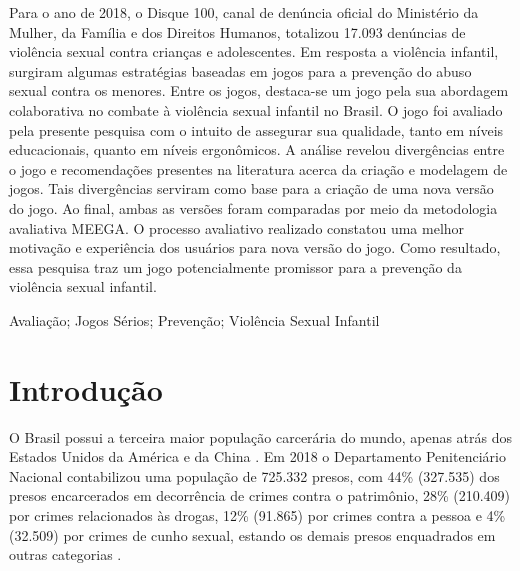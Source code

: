 \documentclass[alpha-refs,brazilian]{RBCA_v2.0}
\begin{document}
\begin{frontmatter}
\begin{resumo}
    Para o ano de 2018, o Disque 100, canal de denúncia oficial do Ministério da Mulher, da Família e dos Direitos Humanos, totalizou 17.093 denúncias de violência sexual contra crianças e adolescentes. Em resposta a violência infantil, surgiram algumas estratégias baseadas em jogos para a prevenção do abuso sexual contra os menores. Entre os jogos, destaca-se um jogo pela sua abordagem colaborativa no combate à violência sexual infantil no Brasil. O jogo foi avaliado pela presente pesquisa com o intuito de assegurar sua qualidade, tanto em níveis educacionais, quanto em níveis ergonômicos. A análise revelou divergências entre o jogo e recomendações presentes na literatura acerca da criação e modelagem de jogos. Tais divergências serviram como base para a criação de uma nova versão do jogo. Ao final, ambas as versões foram comparadas por meio da metodologia avaliativa MEEGA. O processo avaliativo realizado constatou uma melhor motivação e experiência dos usuários para nova versão do jogo. Como resultado, essa pesquisa traz um jogo potencialmente promissor para a prevenção da violência sexual infantil. 
\end{resumo}

\begin{palavras_chave}
	Avaliação; Jogos Sérios; Prevenção; Violência Sexual Infantil
\end{palavras_chave}

\end{frontmatter}
\clearpage


\section{Introdução}
O Brasil possui a terceira maior população carcerária do mundo, apenas atrás dos Estados Unidos da América e da China \citep{mabud2019evaluating}. Em 2018 o Departamento Penitenciário Nacional contabilizou uma população de 725.332 presos, com 44\% (327.535) dos presos encarcerados em decorrência de crimes contra o patrimônio, 28\% (210.409) por crimes relacionados às drogas, 12\% (91.865) por crimes contra a pessoa e 4\% (32.509) por crimes de cunho sexual, estando os demais presos enquadrados em outras categorias \citep{departamento2018levantamento}.
\end{document}

